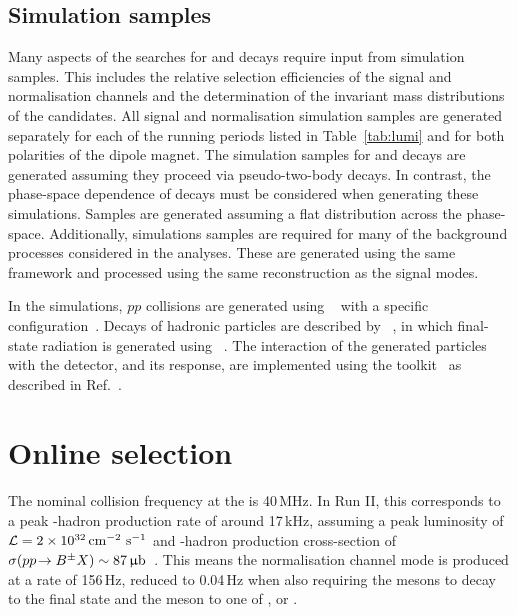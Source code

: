 \subsection{Simulation samples}
\label{sec:mc}

Many aspects of the searches for \decay{\Bp}{\Dsp\phiz} and \decay{\Bp}{\Dsp\Kp\Km} decays require input from simulation samples. This includes the relative selection efficiencies of the signal and normalisation channels and the determination of the invariant mass distributions of the candidates.
All signal and normalisation simulation samples are generated separately for each of the running periods listed in Table~\ref{tab:lumi} and for both polarities of the \lhcb dipole magnet. The simulation samples for \decay{\Bp}{\Dsp\phiz} and \decay{\Bp}{\Dsp\Dzb} decays are generated assuming they proceed via pseudo-two-body decays. In contrast, the phase-space dependence of \decay{\Bp}{\Dsp\Kp\Km} decays must be considered when generating these simulations. Samples are generated assuming a flat distribution across the phase-space. 
Additionally, simulations samples are required for many of the background processes considered in the analyses. These are generated using the same framework and processed using the same reconstruction as the signal modes.


In the simulations, $pp$ collisions are generated using \pythia~\cite{Sjostrand:2007gs,Sjostrand:2006za} with a specific \lhcb configuration~\cite{LHCb-PROC-2010-056}.  Decays of hadronic particles are described by \evtgen~\cite{Lange:2001uf}, in which final-state radiation is generated using \photos~\cite{Golonka:2005pn}. The interaction of the generated particles with the detector, and its response, are implemented using the \geant toolkit~\cite{Allison:2006ve, *Agostinelli:2002hh} as described in Ref.~\cite{LHCb-PROC-2011-006}.


\section{Online selection}
\label{sec:selection_trigger}

The nominal collision frequency at the \lhc is 40\,MHz. In Run II, this corresponds to a peak \Bpm-hadron production rate of around 17\,kHz, assuming a peak luminosity of $\mathcal{L} = 2\times10^{32}\mathrm{ \,cm}^{-2}\,\mathrm{{\,s}}^{-1}$ and \Bpm-hadron production cross-section of $\sigma({p}{p}\!\rightarrow {\ensuremath{{B}^\pm}} X) \sim 87{\mathrm{ \,\upmu b}}$~\cite{LHCb-PAPER-2017-037}. 
This means the normalisation channel mode \decay{\Bp}{\Dsp\Dzb} is produced at a rate of 156\,Hz, reduced to 0.04\,Hz when also requiring the \Dzb mesons to decay to the \Kp\Km final state and the \Dsp meson to one of \Kp\Km\pip, \Kp\pim\pip or \pip\pim\pip.

